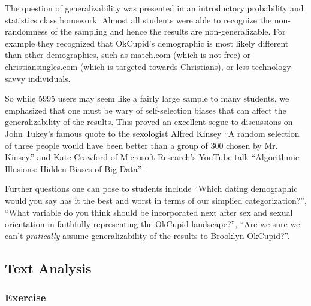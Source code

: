 \documentclass{article}\usepackage[]{graphicx}\usepackage[]{color}
\begin{document}
The question of generalizability was presented in an introductory probability and statistics class homework.  Almost all students were able to recognize the non-randomness of the sampling and hence the results are non-generalizable.  For example they recognized that OkCupid's demographic is most likely different than other demographics, such as match.com (which is not free) or christiansingles.com (which is targeted towards Christians), or less technology-savvy individuals.

So while 5995 users may seem like a fairly large sample to many students, we emphasized that one must be wary of self-selection biases that can affect the generalizability of the results.  This proved an excellent segue to discussions on John Tukey's famous quote to the sexologist Alfred Kinsey ``A random selection of three people would have been better than a group of 300 chosen by Mr. Kinsey.'' and Kate Crawford of Microsoft Research's YouTube talk ``Algorithmic Illusions: Hidden Biases of Big Data''~\cite{Strata}.

Further questions one can pose to students include ``Which dating demographic would you say has it the best and worst in terms of our simplied categorization?'', ``What variable do you think should be incorporated next after sex and sexual orientation in faithfully representing the OkCupid landscape?'', ``Are we sure we can't \textit{pratically} assume generalizability of the results to Brooklyn OkCupid?''.







\subsection{Text Analysis}\label{essays}
\subsubsection{Exercise}
\end{document}
